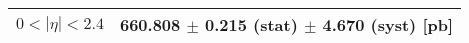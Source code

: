 \begin{tabular}{lc}
\hline
$0 < |\eta| <2.4$              & 660.808 $\pm$ 0.215 (stat) $\pm$ 4.670 (syst) [pb]  \\
\hline
\end{tabular}
